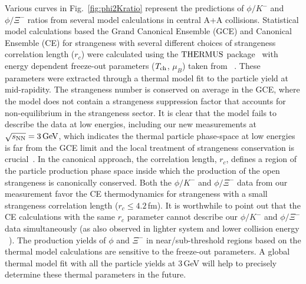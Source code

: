 \documentclass[%
 reprint,	
showpacs,
 amsmath,amssymb,
 aps,
 superscriptaddress,
]{revtex4-1}
\begin{document}
Various curves in Fig.~\ref{fig:phi2Kratio} represent the predictions of $\phi/K^-$ and $\phi/\Xi^-$ ratios from several model calculations in central A+A collisions. Statistical model calculations based the Grand Canonical Ensemble (GCE) and Canonical Ensemble (CE) for strangeness with several different choices of strangeness correlation length ($r_c$) were calculated using the $\textup{THERMUS}$ package~\cite{THERMUS_WHEATON200984} with energy dependent freeze-out parameters ($T_{\rm ch}$, $\mu_B$) taken from ~\cite{Andronic_2018Naure}. These parameters were extracted through a thermal model fit to the particle yield at mid-rapidity. The strangeness number is conserved on average in the GCE, where the model does not contain a strangeness suppression factor that accounts for non-equilibrium in the strangeness sector. %
It is clear that the model fails to describe the data at low energies, including our new measurements at ${\sqrt{s_{\rm NN}} = \rm{3\,GeV}}$, which indicates the thermal particle phase-space at low energies is far from the GCE limit and the local treatment of strangeness conservation is crucial~\cite{BraunMunzinger:2003zd}. In the canonical approach, the correlation length, $r_c$, defines a region of the particle production phase space inside which the production of the open strangeness is canonically conserved. Both the $\phi/K^-$ and $\phi/\Xi^-$ data from our measurement favor the CE thermodynamics for strangeness with a small strangeness correlation length ($r_c \leq 4.2$\,fm). It is worthwhile to point out that the CE calculations with the same $r_c$ parameter cannot describe our $\phi/K^-$ and $\phi/\Xi^-$ data simultaneously (as also observed in lighter system and lower collision energy ~\cite{HADES_phi_ArKCl}). The production yields of $\phi$ and $\Xi^-$ in near/sub-threshold regions based on the thermal model calculations are sensitive to the freeze-out parameters. 
A global thermal model fit with all the particle yields at 3\,GeV will help to precisely determine these thermal parameters in the future. %
\end{document}
